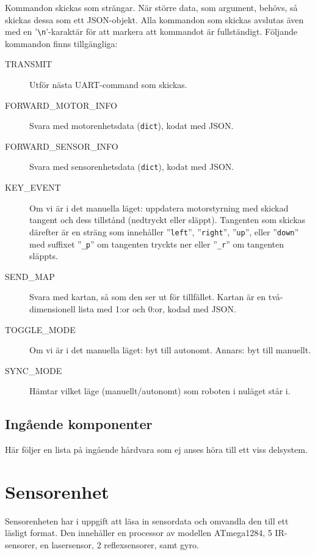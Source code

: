\documentclass[a4paper,11pt]{article}
\begin{document}
Kommandon skickas som strängar. När större data, som argument, behövs, så skickas dessa som ett JSON-objekt.
Alla kommandon som skickas avslutas även med en '\texttt{\textbackslash n}'-karaktär för att markera att kommandot är fullständigt. Följande kommandon finns tillgängliga:

\begin{description}
    \item [TRANSMIT] Utför nästa UART-command som skickas.
    \item [FORWARD\_MOTOR\_INFO] Svara med motorenhetsdata (\texttt{dict}), kodat med JSON.
    \item [FORWARD\_SENSOR\_INFO] Svara med sensorenhetsdata (\texttt{dict}), kodat med JSON.
    \item [KEY\_EVENT] Om vi är i det manuella läget: uppdatera motorstyrning med skickad tangent och dess tillstånd (nedtryckt eller släppt). Tangenten som skickas därefter är en sträng som innehåller ''\texttt{left}'', ''\texttt{right}'', ''\texttt{up}'', eller ''\texttt{down}'' med suffixet ''\texttt{\_p}'' om tangenten tryckts ner eller ''\texttt{\_r}'' om tangenten släppts.
    \item [SEND\_MAP] Svara med kartan, så som den ser ut för tillfället. Kartan är en två-dimensionell lista med 1:or och 0:or, kodad med JSON.
    \item [TOGGLE\_MODE] Om vi är i det manuella läget: byt till autonomt. Annars: byt till manuellt.
    \item [SYNC\_MODE] Hämtar vilket läge (manuellt/autonomt) som roboten i nuläget står i.
\end{description}

\subsection{Ingående komponenter}
Här följer en lista på ingående hårdvara som ej anses höra till ett viss delsystem.

\begin{HardwareList}
\end{HardwareList}

\clearpage
\section{Sensorenhet} \label{sec:system1}
Sensorenheten har i uppgift att läsa in sensordata och omvandla den till ett läsligt format. Den innehåller en processor av modellen ATmega1284, 5 IR-sensorer, en lasersensor, 2 reflexsensorer, samt gyro.
\end{document}
